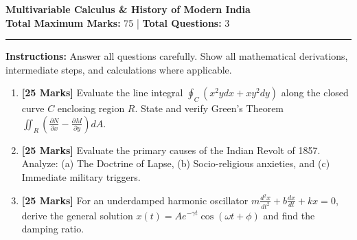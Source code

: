 \documentclass[11pt,a4paper]{article}
\begin{document}
\begin{center}
    {\LARGE \textbf{ Multivariable Calculus & History of Modern India }} \\[0.5em]
    \textbf{Total Maximum Marks:} 75 \quad | \quad \textbf{Total Questions:} 3
\end{center}

\vspace{1em}
\hrule
\vspace{1.5em}

\noindent \textbf{Instructions:} Answer all questions carefully. Show all mathematical derivations, intermediate steps, and calculations where applicable.

\vspace{1.5em}

\begin{enumerate}[label=\textbf{Q\arabic*.}, leftmargin=2em]

    \item \textbf{[25 Marks]} Evaluate the line integral $\oint_C (x^2 y dx + x y^2 dy)$ along the closed curve $C$ enclosing region $R$. State and verify Green's Theorem $\iint_R (\frac{\partial N}{\partial x} - \frac{\partial M}{\partial y}) dA$.
    
    \vspace{1em}

    \item \textbf{[25 Marks]} Evaluate the primary causes of the Indian Revolt of 1857. Analyze: (a) The Doctrine of Lapse, (b) Socio-religious anxieties, and (c) Immediate military triggers.
    
    \vspace{1em}

    \item \textbf{[25 Marks]} For an underdamped harmonic oscillator $m\frac{d^2x}{dt^2} + b\frac{dx}{dt} + kx = 0$, derive the general solution $x(t) = A e^{-\gamma t} \cos(\omega t + \phi)$ and find the damping ratio.
    
    \vspace{1em}

\end{enumerate}
\end{document}
